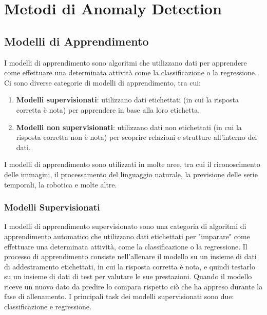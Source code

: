 \chapter{Metodi di Anomaly Detection}
\label{chap:methods}

\section{Modelli di Apprendimento}
I modelli di apprendimento sono algoritmi che utilizzano dati per apprendere come effettuare una determinata attività come la classificazione o la regressione. Ci sono diverse categorie di modelli di apprendimento, tra cui:
\begin{enumerate}
\item \textbf{Modelli supervisionati}: utilizzano dati etichettati (in cui la risposta corretta è nota) per apprendere in base alla loro etichetta.
\item \textbf{Modelli non supervisionati}: utilizzano dati non etichettati (in cui la risposta corretta non è nota) per scoprire relazioni e strutture all'interno dei dati.
\end{enumerate}

I modelli di apprendimento sono utilizzati in molte aree, tra cui il riconoscimento delle immagini, il processamento del linguaggio naturale, la previsione delle serie temporali, la robotica e molte altre.

\subsection{Modelli Supervisionati}
I modelli di apprendimento supervisionato sono una categoria di algoritmi di apprendimento automatico che utilizzano dati etichettati per "imparare" come effettuare una determinata attività, come la classificazione o la regressione. Il processo di apprendimento consiste nell'allenare il modello su un insieme di dati di addestramento etichettati, in cui la risposta corretta è nota, e quindi testarlo su un insieme di dati di test per valutare le sue prestazioni. Quando il modello riceve un nuovo dato da predire lo compara rispetto ciò che ha appreso durante la fase di allenamento. I principali task dei modelli supervisionati sono due: classificazione e regressione.

